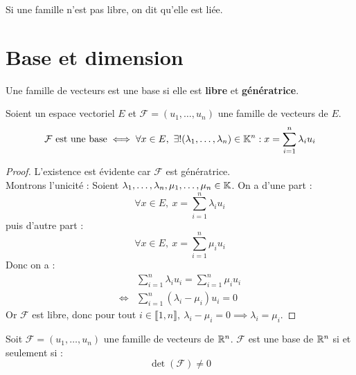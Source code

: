 \begin{remark}
	Si une famille n'est pas libre, on dit qu'elle est liée.
\end{remark}

\section{Base et dimension}
\begin{definition}[Base]
	Une famille de vecteurs est une base si elle est \textbf{libre} et \textbf{génératrice}.
\end{definition}

\begin{proposition}
	Soient un espace vectoriel $E$ et $\mathcal{F} = (u_1, \ldots, u_n)$ une famille de vecteurs de $E$.
	\[ 
	\mathcal{F} \text{ est une base} \iff 
	\forall x \in E,\ \exists ! (\lambda_1, \ldots, \lambda_n) \in \mathbb{K}^n : x = \sum_{i = 1}^n \lambda_i u_i
	\]
\end{proposition}

\begin{proof}
	L'existence est évidente car $\mathcal{F}$ est génératrice. 
	\\
	Montrons l'unicité : Soient $\lambda_1, \ldots, \lambda_n, \mu_1, \ldots, \mu_n \in \mathbb{K}$.
	On a d'une part :
	\[ \forall x \in E,\ x = \sum_{i=1}^{n} \lambda_i u_i \]
	puis d'autre part :
	\[ \forall x \in E,\ x = \sum_{i=1}^{n} \mu_i u_i \]
	Donc on a :
	\begin{align*}
		&\sum_{i=1}^{n} \lambda_i u_i = \sum_{i=1}^{n} \mu_i u_i \\
		\iff &\sum_{i=1}^{n} (\lambda_i - \mu_i) u_i = 0 
	\end{align*}
	Or $\mathcal{F}$ est libre, donc pour tout $i \in \llbracket 1, n \rrbracket,\ \lambda_i - \mu_i = 0 \implies \lambda_i = \mu_i$.
\end{proof}

\begin{proposition}
	Soit $\mathcal{F} = (u_1, \ldots, u_n)$ une famille de vecteurs de $\mathbb{R}^n$. $\mathcal{F}$ est une base de $\mathbb{R}^n$ si et seulement si :
	\[ \det(\mathcal{F}) \neq 0 \]
\end{proposition}

